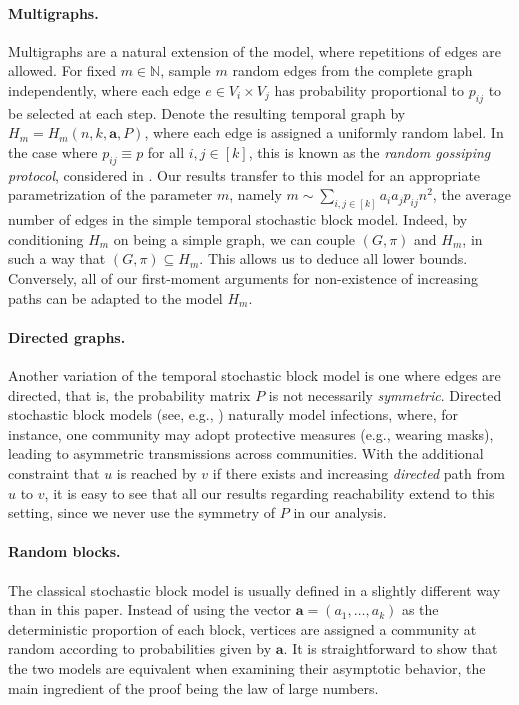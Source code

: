 \documentclass[11pt]{article}
\numberwithin{equation}{section}
\theoremstyle{definition}
\newcommand\bN{{\mathbb N}}
\begin{document}
\paragraph{Multigraphs.} Multigraphs are a natural extension of the model, where repetitions of edges are allowed. For fixed $m \in \bN$, sample $m$ random edges from the complete graph independently, where each edge $e \in V_i\times V_j$ has probability proportional to $p_{ij}$ to be selected at each step. Denote the resulting temporal graph by $H_m = H_m(n,k,\boldsymbol{a},P)$, where each edge is assigned a uniformly random label. In the case where $p_{ij}\equiv p$ for all $i,j \in [k]$, this is known as the \emph{random gossiping protocol}, considered in \cite{BS79,H81,M72,MSA20,MSRA16,VKS17}. Our results transfer to this model for an appropriate parametrization of the parameter $m$, namely $m \sim \sum_{i,j \in [k]} a_ia_jp_{ij}n^2$, the average number of edges in the simple temporal stochastic block model. Indeed, by conditioning $H_{m}$ on being a simple graph, we can couple $(G,\pi)$ and $H_m$, in such a way that $(G,\pi)\subseteq H_{m}$. This allows us to deduce all lower bounds. Conversely, all of our first-moment arguments for non-existence of increasing paths can be adapted to the model $H_{m}$.

\paragraph{Directed graphs.} Another variation of the temporal stochastic block model is one where edges are directed, that is, the probability matrix $P$ is not necessarily \emph{symmetric}. Directed stochastic block models (see, e.g., \cite{WW87, A15, AB00}) naturally model infections, where, for instance, one community may adopt protective measures (e.g., wearing masks), leading to asymmetric transmissions across communities. With the additional constraint that $u$ is reached by $v$ if there exists and increasing \emph{directed} path from $u$ to $v$, it is easy to see that all our results regarding reachability extend to this setting, since we never use the symmetry of $P$ in our analysis.

\paragraph{Random blocks.} The classical stochastic block model is usually defined in a slightly different way than in this paper. Instead of using the vector $\boldsymbol{a} = (a_1,\ldots,a_k)$ as the deterministic proportion of each block, vertices are assigned a community at random according to probabilities given by $\boldsymbol{a}$. It is straightforward to show that the two models are equivalent when examining their asymptotic behavior, the main ingredient of the proof being the law of large numbers.
\end{document}
